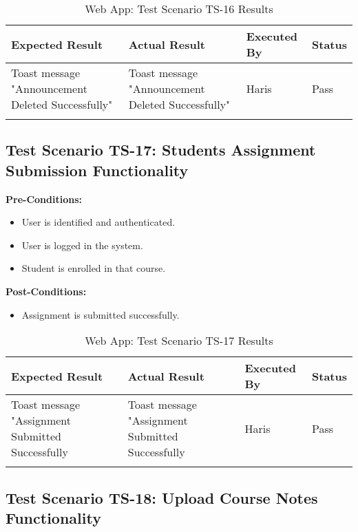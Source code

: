 \bigskip

\begin{longtable}{|p{4cm}|p{4cm}|p{2cm}|p{2cm}|}
\hline
\textbf{Expected Result} & \textbf{Actual Result} & \textbf{Executed By} & \textbf{Status}\\
\hline
Toast message "Announcement Deleted Successfully" &
Toast message "Announcement Deleted Successfully" &
Haris &
Pass \\
\hline

\caption{Web App: Test Scenario TS-16 Results}
\end{longtable}


\subsection{Test Scenario TS-17: Students Assignment Submission Functionality}

\textbf{Pre-Conditions: }
\begin{itemize}

\item User is identified and authenticated.
\item User is logged in the system.
\item Student is enrolled in that course.

\end{itemize}

\textbf{Post-Conditions: }
\begin{itemize}

\item Assignment is submitted successfully.

\end{itemize}


\bigskip

\begin{longtable}{|p{4cm}|p{4cm}|p{2cm}|p{2cm}|}
\hline
\textbf{Expected Result} & \textbf{Actual Result} & \textbf{Executed By} & \textbf{Status}\\
\hline
Toast message "Assignment Submitted Successfully &
Toast message "Assignment Submitted Successfully &
Haris &
Pass \\
\hline

\caption{Web App: Test Scenario TS-17 Results}
\end{longtable}


\subsection{Test Scenario TS-18: Upload Course Notes Functionality}


